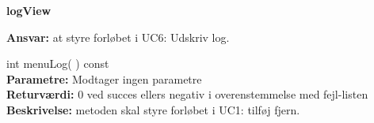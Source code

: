 {\centering
\textbf{logView}\par
}
\textbf{Ansvar:} at styre forløbet i UC6: Udskriv log. \

int menuLog( ) const \\
\textbf{Parametre:} Modtager ingen parametre \\
\textbf{Returværdi:} 0 ved succes ellers negativ i overenstemmelse med fejl-listen \\
\textbf{Beskrivelse:} metoden skal styre forløbet i UC1: tilføj fjern.\\

